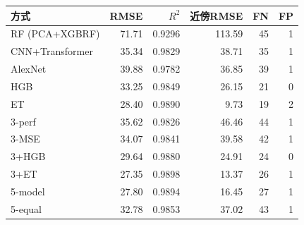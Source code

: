 \begin{tabular}{lrrrrr}
\toprule
方式 & RMSE & $R^2$ & 近傍RMSE & FN & FP \\
\midrule
RF (PCA+XGBRF) & 71.71 & 0.9296 & 113.59 & 45 & 1 \\
CNN+Transformer & 35.34 & 0.9829 & 38.71 & 35 & 1 \\
AlexNet & 39.88 & 0.9782 & 36.85 & 39 & 1 \\
HGB & 33.25 & 0.9849 & 26.15 & 21 & 0 \\
ET & 28.40 & 0.9890 & 9.73 & 19 & 2 \\
3-perf & 35.62 & 0.9826 & 46.46 & 44 & 1 \\
3-MSE & 34.07 & 0.9841 & 39.58 & 42 & 1 \\
3+HGB & 29.64 & 0.9880 & 24.91 & 24 & 0 \\
3+ET & 27.35 & 0.9898 & 13.37 & 26 & 1 \\
5-model & 27.80 & 0.9894 & 16.45 & 27 & 1 \\
5-equal & 32.78 & 0.9853 & 37.02 & 43 & 1 \\
\bottomrule
\end{tabular}
